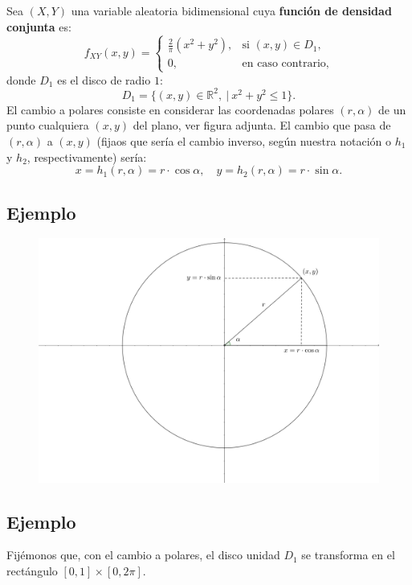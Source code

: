 \documentclass[]{book}
\begin{document}
Sea \((X,Y)\) una variable aleatoria bidimensional cuya \textbf{función de densidad conjunta} es:
\[
f_{XY}(x,y)=
\begin{cases}
\frac{2}{\pi}\left(x^2 + y^2\right), & \mbox{si }(x,y)\in D_1, \\
0, & \mbox{en caso contrario,}
\end{cases}
\]
donde \(D_1\) es el disco de radio \(1\):
\[
D_1 = \{(x,y)\in\mathbb{R}^2,\ | \ x^2+y^2\leq 1\}.
\]
El cambio a polares consiste en considerar las coordenadas polares \((r,\alpha)\) de un punto cualquiera \((x,y)\) del plano, ver figura adjunta. El cambio que pasa de \((r,\alpha)\) a \((x,y)\) (fijaos que sería el cambio inverso, según nuestra notación o \(h_1\)y \(h_2\), respectivamente) sería:
\[
x=h_1(r,\alpha)=r\cdot \cos\alpha,\quad y=h_2(r,\alpha)=r\cdot \sin\alpha.
\]

\hypertarget{ejemplo-79}{%
\subsection{Ejemplo}\label{ejemplo-79}}

\begin{figure}
\includegraphics[width=750px]{Images/Polares} \end{figure}

\hypertarget{ejemplo-80}{%
\subsection{Ejemplo}\label{ejemplo-80}}

Fijémonos que, con el cambio a polares, el disco unidad \(D_1\) se transforma en el rectángulo \([0,1]\times [0,2\pi]\).
\end{document}
